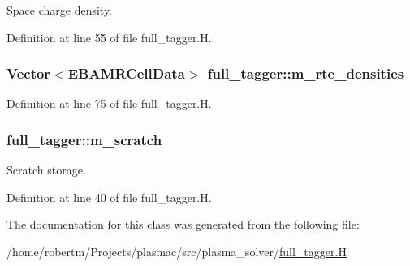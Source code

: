 Space charge density. 



Definition at line 55 of file full\+\_\+tagger.\+H.

\subsubsection[{\texorpdfstring{m\+\_\+rte\+\_\+densities}{m_rte_densities}}]{\setlength{\rightskip}{0pt plus 5cm}Vector$<${\bf E\+B\+A\+M\+R\+Cell\+Data}$>$ full\+\_\+tagger\+::m\+\_\+rte\+\_\+densities\hspace{0.3cm}{\ttfamily [protected]}}\hypertarget{classfull__tagger_a769e3790de596ce3e0cfbca85ba1196c}{}\label{classfull__tagger_a769e3790de596ce3e0cfbca85ba1196c}


Definition at line 75 of file full\+\_\+tagger.\+H.

\subsubsection[{\texorpdfstring{m\+\_\+scratch}{m_scratch}}]{ full\+\_\+tagger\+::m\+\_\+scratch\hspace{0.3cm}{\ttfamily [protected]}}\hypertarget{classfull__tagger_aff6a219319b146ec4b9f9bc7945e7907}{}\label{classfull__tagger_aff6a219319b146ec4b9f9bc7945e7907}


Scratch storage. 



Definition at line 40 of file full\+\_\+tagger.\+H.



The documentation for this class was generated from the following file\+:\begin{DoxyCompactItemize}
\item 
/home/robertm/\+Projects/plasmac/src/plasma\+\_\+solver/\hyperlink{full__tagger_8H}{full\+\_\+tagger.\+H}\end{DoxyCompactItemize}
